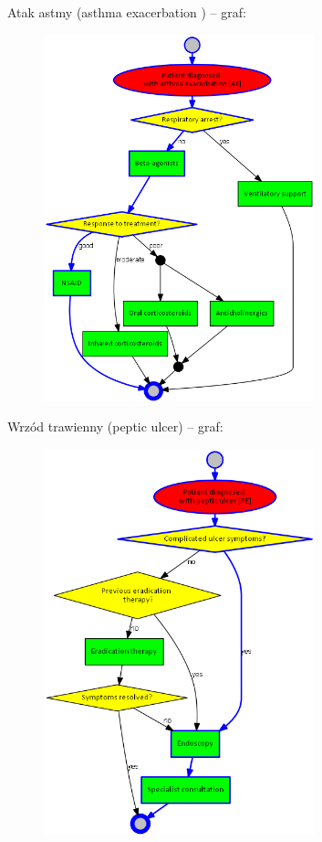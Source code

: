 \documentclass[oneside,a4paper]{book}
\begin{document}
\begin{spacing}{1.5}
Atak astmy (asthma exacerbation ) – graf:
\begin{figure}[H]
\centering
\includegraphics[width=0.7\textwidth]{img/asthma.png}
\end{figure}
\newpage
Wrzód trawienny (peptic ulcer) – graf:
\begin{figure}[H]
\centering
\includegraphics[width=0.7\textwidth]{img/peptic-ulcer.png}

\end{figure}
\end{spacing}
\end{document}
